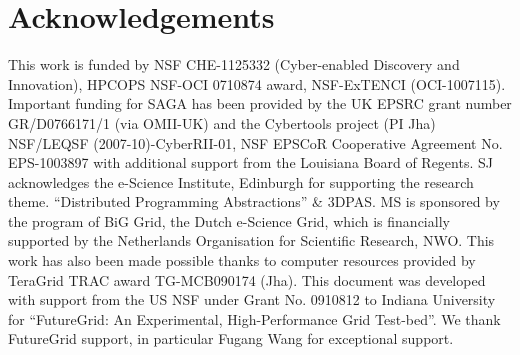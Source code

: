 \documentclass[times]{cpeauth}
\begin{document}
\section*{Acknowledgements}
\footnotesize{This work is funded by NSF CHE-1125332 (Cyber-enabled
  Discovery and Innovation), HPCOPS NSF-OCI 0710874 award, NSF-ExTENCI
  (OCI-1007115).  Important funding for SAGA has been provided by the
  UK EPSRC grant number GR/D0766171/1 (via OMII-UK) and the Cybertools
  project (PI Jha) NSF/LEQSF (2007-10)-CyberRII-01, NSF EPSCoR
  Cooperative Agreement No. EPS-1003897 with additional support from
  the Louisiana Board of Regents.  SJ acknowledges the e-Science
  Institute, Edinburgh for supporting the research
  theme. ``Distributed Programming Abstractions'' \& 3DPAS. MS is
  sponsored by the program of BiG Grid, the Dutch e-Science Grid,
  which is financially supported by the Netherlands Organisation for
  Scientific Research, NWO. This work has also been made possible
  thanks to computer resources provided by TeraGrid TRAC award
  TG-MCB090174 (Jha). This document was developed with support from
  the US NSF under Grant No. 0910812 to Indiana University for
  ``FutureGrid: An Experimental, High-Performance Grid Test-bed''. We
  thank FutureGrid support, in particular Fugang Wang for exceptional
  support.}



\end{document}
